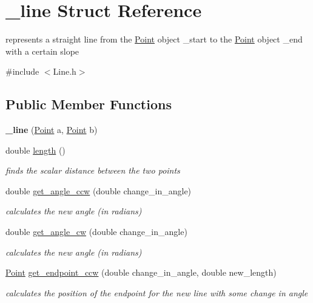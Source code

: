 \hypertarget{struct__line}{}\section{\+\_\+line Struct Reference}
\label{struct__line}


represents a straight line from the \mbox{\hyperlink{struct_point}{Point}} object \+\_\+start to the \mbox{\hyperlink{struct_point}{Point}} object \+\_\+end with a certain slope  




{\ttfamily \#include $<$Line.\+h$>$}

\subsection*{Public Member Functions}
\begin{DoxyCompactItemize}
\item 
\mbox{\label{struct__line_a016cc0785a680ccea5824cd8e6a19a68}} 
{\bfseries \+\_\+line} (\mbox{\hyperlink{struct_point}{Point}} a, \mbox{\hyperlink{struct_point}{Point}} b)
\item 
double \mbox{\hyperlink{struct__line_a1438b816e0c4c3fa952d7e2ebda2b1a4}{length}} ()
\begin{DoxyCompactList}\small\item\em finds the scalar distance between the two points \end{DoxyCompactList}\item 
double \mbox{\hyperlink{struct__line_ae7c7e02e80626dd3ef066c5bd4e57f33}{get\+\_\+angle\+\_\+ccw}} (double change\+\_\+in\+\_\+angle)
\begin{DoxyCompactList}\small\item\em calculates the new angle (in radians) \end{DoxyCompactList}\item 
double \mbox{\hyperlink{struct__line_a553d4c8e729337a21badab0c8d0f0a99}{get\+\_\+angle\+\_\+cw}} (double change\+\_\+in\+\_\+angle)
\begin{DoxyCompactList}\small\item\em calculates the new angle (in radians) \end{DoxyCompactList}\item 
\mbox{\hyperlink{struct_point}{Point}} \mbox{\hyperlink{struct__line_a3bb1fb1d6a0577adc3093e37929fd2a9}{get\+\_\+endpoint\+\_\+ccw}} (double change\+\_\+in\+\_\+angle, double new\+\_\+length)
\begin{DoxyCompactList}\small\item\em calculates the position of the endpoint for the new line with some change in angle \end{DoxyCompactList}\item 

\end{DoxyCompactItemize}
